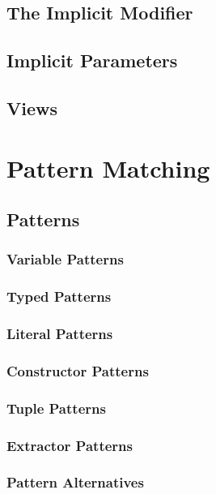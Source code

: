 \section{The Implicit Modifier}

\section{Implicit Parameters}
\label{sec:implicit-parameters}

\section{Views}

\chapter{Pattern Matching}

\section{Patterns}
\label{sec:patterns}

\subsection{Variable Patterns}

\subsection{Typed Patterns}

\subsection{Literal Patterns}

\subsection{Constructor Patterns}

\subsection{Tuple Patterns}

\subsection{Extractor Patterns}

\subsection{Pattern Alternatives}

